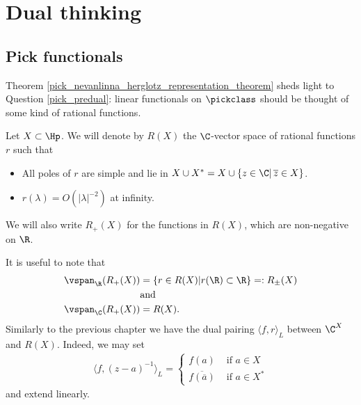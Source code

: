 \section{Dual thinking}
\subsection{Pick functionals}

Theorem \ref{pick_nevanlinna_herglotz_representation_theorem} sheds light to Question \ref{pick_predual}: linear functionals on $\pickclass$ should be thought of some kind of rational functions.
\begin{maar}
	Let $X \subset \Hp$. We will denote by $R(X)$ the $\C$-vector space of rational functions $r$ such that
	\begin{itemize}
		\item All poles of $r$ are simple and lie in $X \cup X^{*} = X \cup \{z \in \C |\, \overline{z} \in X\}$.
		\item $r(\lambda) = O(|\lambda|^{-2})$ at infinity.
	\end{itemize}
	We will also write $R_{+}(X)$ for the functions in $R(X)$, which are non-negative on $\R$.
\end{maar}
It is useful to note that
\begin{align}\label{pick_functional_span}
	\vspan_{\R}(R_{+}(X)) &= \{r \in R(X) | r(\R) \subset \R \} =: R_{\pm}(X) \nonumber\\
	&\text{and} \\
	\vspan_{\C}(R_{+}(X)) &= R(X). \nonumber
\end{align}
Similarly to the previous chapter we have the dual pairing $\langle f, r \rangle_{L}$ between $\C^{X}$ and $R(X)$. Indeed, we may set
\begin{align*}
	\langle f, (z - a)^{-1} \rangle_{L} =
	\begin{cases}
		f(a) & \text{ if $a \in X$} \\
		\overline{f(\overline{a})} & \text{ if $a \in X^{*}$}
	\end{cases}
\end{align*}
and extend linearly.

